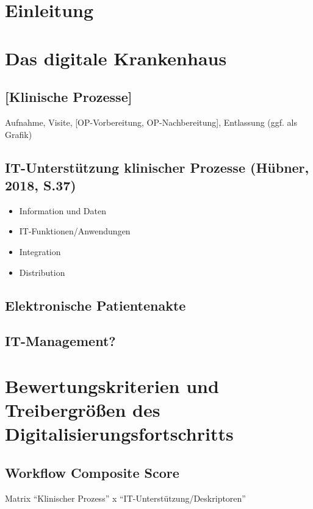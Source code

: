 
{}
\section{Einleitung}
\section{Das digitale Krankenhaus}
	\subsection{[Klinische Prozesse]}
		Aufnahme, Visite, [OP-Vorbereitung, OP-Nachbereitung], Entlassung (ggf. als Grafik)
	\subsection{IT-Unterstützung klinischer Prozesse (Hübner, 2018, S.37)}
	\begin{itemize}
		\item Information und Daten
		\item IT-Funktionen/Anwendungen
		\item Integration
		\item Distribution
	\end{itemize}
	\subsection{ Elektronische Patientenakte}
	\subsection{IT-Management?}
\section{Bewertungskriterien und Treibergrößen des Digitalisierungsfortschritts}
	\subsection{Workflow Composite Score}
		Matrix “Klinischer Prozess” x “IT-Unterstützung/Deskriptoren”
